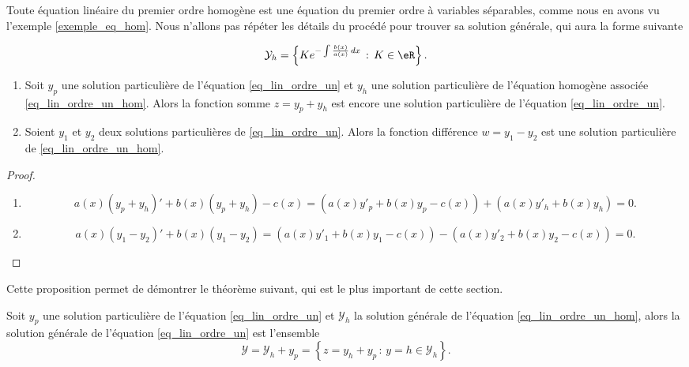Toute équation linéaire du premier ordre homogène est une équation du premier ordre à variables séparables, comme nous en avons vu l'exemple \ref{exemple_eq_hom}. Nous n'allons pas répéter les détails du procédé pour trouver sa solution générale, qui aura la forme suivante
\begin{Aretenir}
	\begin{equation}\label{solgeneqlinordre1}
		\mathcal{Y}_h=\left\{Ke^{-\int\frac{b(x)}{a(x)}\, dx}\,:\, K\in\eR\right\}.
	\end{equation}
\end{Aretenir}
\begin{proposition}
	\begin{enumerate}
		\item Soit \( y_p\) une solution particulière de l'équation \eqref{eq_lin_ordre_un} et \( y_h\) une solution particulière de l'équation homogène associée \eqref{eq_lin_ordre_un_hom}. Alors la fonction somme \( z= y_p+y_h\) est encore une solution particulière de l'équation \eqref{eq_lin_ordre_un}.
		\item Soient \( y_1\) et \( y_2\) deux solutions particulières de \eqref{eq_lin_ordre_un}. Alors la fonction différence \( w = y_1-y_2\) est une solution particulière de \eqref{eq_lin_ordre_un_hom}.
	\end{enumerate}
\end{proposition}
\begin{proof}
	\begin{enumerate}
		\item
		      \begin{equation}
			      a(x)\left(y_p+y_h\right)' + b(x)\left(y_p+y_h\right)-c(x)  =\left( a(x)y'_p+ b(x)y_p-c(x)\right) + \left( a(x)y'_h+ b(x)y_h\right) = 0.
		      \end{equation}
		\item
		      \begin{equation}
			      a(x)\left(y_1-y_2\right)' + b(x)\left(y_1-y_2\right) =\left( a(x)y'_1+ b(x)y_1-c(x)\right) -\left( a(x)y'_2+ b(x)y_2-c(x)\right) = 0.
		      \end{equation}
	\end{enumerate}
\end{proof}
Cette proposition permet de démontrer le théorème suivant, qui est le plus important de cette section.
\begin{theorem}
	Soit \( y_p\) une solution particulière de l'équation \eqref{eq_lin_ordre_un} et \( \mathcal{Y}_h\) la solution générale de l'équation \eqref{eq_lin_ordre_un_hom}, alors la solution générale de l'équation \eqref{eq_lin_ordre_un} est l'ensemble
	\begin{equation}
		\mathcal{Y} = \mathcal{Y}_h +y_p = \left\{z= y_h + y_p\,:\, y=h \in\mathcal{Y}_h \right\}.
	\end{equation}
\end{theorem}
